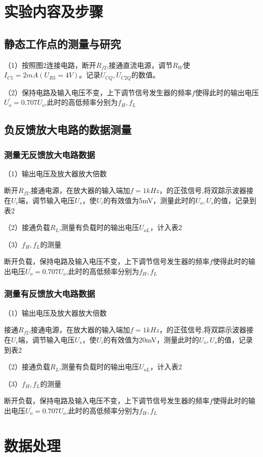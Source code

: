 \documentclass{article}
\begin{document}
\section{ 实验内容及步骤}
\subsection {静态工作点的测量与研究}
（1）按照图2连接电路，断开$R_{f2}$,接通直流电源，调节$R_W$使$I_{C1}=2mA(U_{R3}=4V)$。记录$U_{CQ},U_{C2Q}$的数值。\par
（2）保持电路及输入电压不变，上下调节信号发生器的频率$f$使得此时的输出电压$U_o^{'}=0.707U_o$,此时的高低频率分别为$f_H,f_L$
	
\subsection{负反馈放大电路的数据测量}
\subsubsection{测量无反馈放大电路数据}
（1）输出电压及放大器放大倍数\par
断开$R_{f2}$,接通电源，在放大器的输入端加$f=1kHz$，的正弦信号,将双踪示波器接在$U_i$端，调节输入电压$U_s$，使$U_i$的有效值为5mV，测量此时的$U_o,U_s$的值，记录到表2\par
（2）接通负载$R_L$,测量有负载时的输出电压$U_{oL}$，计入表2\par
（3）$f_H,f_L$的测量\par
断开负载，保持电路及输入电压不变，上下调节信号发生器的频率$f$使得此时的输出电压$U_o^{'}=0.707U_o$,此时的高低频率分别为$f_H,f_L$\par
\subsubsection{测量有反馈放大电路数据}
（1）输出电压及放大器放大倍数\par
接通$R_{f2}$,接通电源，在放大器的输入端加$f=1kHz$，的正弦信号,将双踪示波器接在$U_i$端，调节输入电压$U_s$，使$U_i$的有效值为20mV，测量此时的$U_o,U_s$的值，记录到表2\par
（2）接通负载$R_L$,测量有负载时的输出电压$U_{oL}$，计入表2\par
（3）$f_H,f_L$的测量\par
断开负载，保持电路及输入电压不变，上下调节信号发生器的频率$f$使得此时的输出电压$U_o^{'}=0.707U_o$,此时的高低频率分别为$f_H,f_L$\par
\newpage
	\section{ 数据处理}
\end{document}
